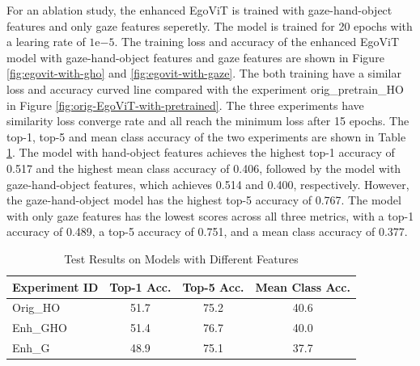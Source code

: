 For an ablation study, the enhanced EgoViT is trained with gaze-hand-object features and only gaze features seperetly. The model is trained for 20 epochs with a learing rate of $1 \mathrm{e}{-5}$. The training loss and accuracy of the enhanced EgoViT model with gaze-hand-object features and gaze features are shown in Figure \ref{fig:egovit-with-gho} and \ref{fig:egovit-with-gaze}. The both training have a similar loss and accuracy curved line compared with the experiment orig\_pretrain\_HO in Figure \ref{fig:orig-EgoViT-with-pretrained}. The three experiments have similarity loss converge rate and all reach the minimum loss after 15 epochs. The top-1, top-5 and mean class accuracy of the two experiments are shown in Table \ref{tab:Results_table2}. The model with hand-object features achieves the highest top-1 accuracy of 0.517 and the highest mean class accuracy of 0.406, followed by the model with gaze-hand-object features, which achieves 0.514 and 0.400, respectively. However, the gaze-hand-object model has the highest top-5 accuracy of 0.767. The model with only gaze features has the lowest scores across all three metrics, with a top-1 accuracy of 0.489, a top-5 accuracy of 0.751, and a mean class accuracy of 0.377. \newline
\begin{table}[h]
    \centering
    \caption{Test Results on Models with Different Features}
    \begin{tabular}{lccc}
    \hline\hline
    Experiment ID & Top-1 Acc. & Top-5 Acc. & Mean Class Acc. \\
    \hline
    Orig\_HO        & 51.7 & 75.2 & 40.6 \\
    Enh\_GHO     & 51.4 & 76.7 & 40.0 \\
    Enh\_G       & 48.9 & 75.1 & 37.7 \\
    \hline\hline
    \end{tabular}
    \label{tab:Results_table2}
\end{table}

